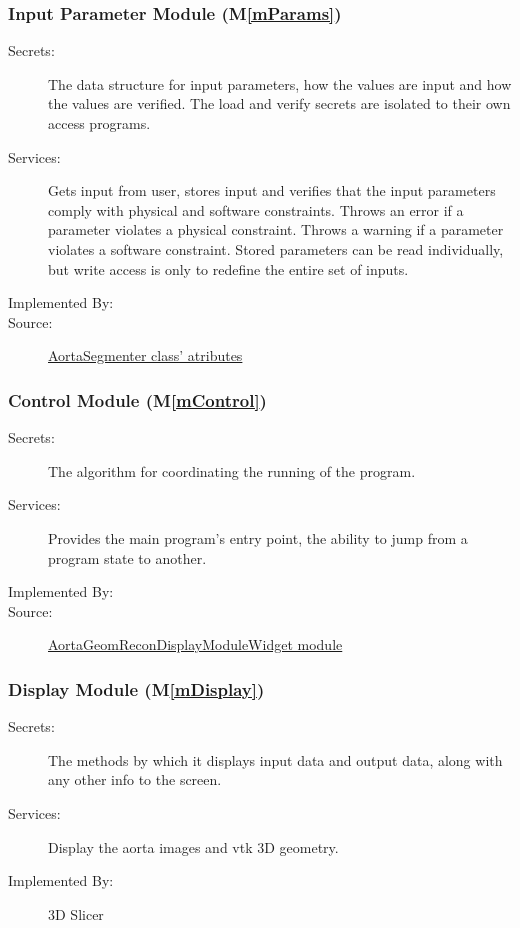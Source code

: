 \documentclass[12pt, titlepage]{article}
\newcommand{\mref}[1]{M\ref{#1}}
\begin{document}
\subsubsection{Input Parameter Module (\mref{mParams})}

\begin{description}
\item[Secrets:] The data structure for input parameters, how the
values are input and how the values are verified.  The load and verify secrets
are isolated to their own access programs.
\item[Services:] Gets input from user, stores input and verifies that the
  input parameters comply with physical and software constraints. Throws an
  error if a parameter violates a physical constraint. Throws a warning if a
  parameter violates a software constraint.  Stored parameters can be read
  individually, but write access is only to redefine the entire set of inputs.
\item[Implemented By:] \progname{}
\item[Source:] \href{https://joviel25.github.io/AortaGR-design-document/AortaGeomReconDisplayModuleLib.html#AortaSegmenter.AortaSegmenter}{AortaSegmenter class' atributes}
\end{description}

\subsubsection{Control Module (\mref{mControl})}

\begin{description}
\item[Secrets:]The algorithm for coordinating the running of the program.
\item[Services:]Provides the main program's entry point, the ability to jump from a program state to another.
\item[Implemented By:] \progname
\item[Source:] \href{https://joviel25.github.io/AortaGR-design-document/AortaGeomReconDisplayModule.html#AortaGeomReconDisplayModule.AortaGeomReconDisplayModuleWidget.onApplyButton}{AortaGeomReconDisplayModuleWidget module}
\end{description}

\subsubsection{Display Module (\mref{mDisplay})}
\begin{description}
\item[Secrets:]The methods by which it displays input data and output data, along 
with any other info to the screen.
\item[Services:]Display the aorta images and vtk 3D geometry.
\item[Implemented By:] 3D Slicer
\end{description}
\end{document}
